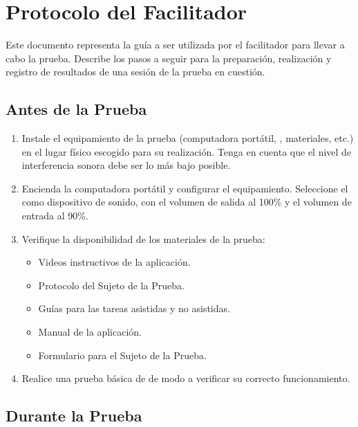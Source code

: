 \section{Protocolo del Facilitador}

Este documento representa la gu\'ia a ser utilizada por el facilitador para llevar a cabo la
prueba. Describe los pasos a seguir para la preparaci\'on, realizaci\'on y registro de resultados de una sesión de la prueba en cuesti\'on.

\subsection{Antes de la Prueba}

\begin{enumerate}
    \item Instale el equipamiento de la prueba (computadora port\'atil, , materiales, 
    etc.) en el lugar f\'isico escogido para su realizaci\'on. Tenga en cuenta que el nivel de
    interferencia sonora debe ser lo m\'as bajo posible.
    \item Encienda la computadora port\'atil y configurar el equipamiento. Seleccione el  como dispositivo de sonido, con el volumen de salida al 100\% y el 
    volumen de entrada al 90\%.
    \item Verifique la disponibilidad de los materiales de la prueba:
    \begin{itemize}
        \item Videos instructivos de la aplicaci\'on.
        \item Protocolo del Sujeto de la Prueba.
        \item Gu\'ias para las tareas asistidas y no asistidas.
        \item Manual de la aplicaci\'on.
        \item Formulario para el Sujeto de la Prueba.
    \end{itemize}
    \item Realice una prueba b\'asica de  de modo a verificar su 
    correcto funcionamiento. 
\end{enumerate}

\subsection{Durante la Prueba}

